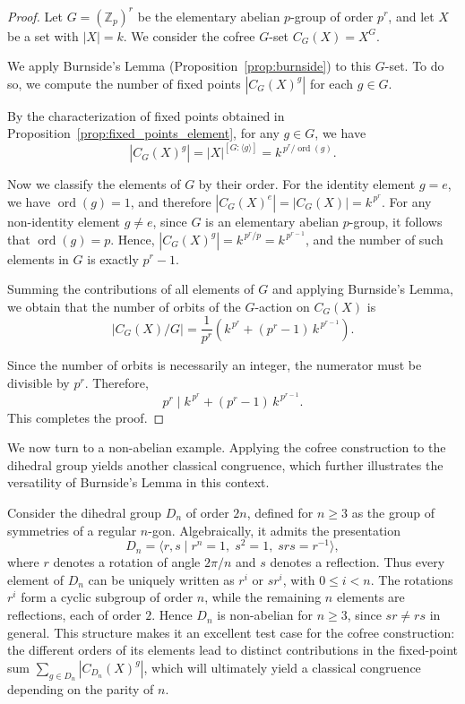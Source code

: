 \documentclass{amsart}
\begin{document}
\begin{proof}
Let $G = (\mathbb{Z}_p)^r$ be the elementary abelian $p$-group of order $p^r$, and let $X$ be a set with $|X| = k$. We consider the cofree $G$-set $C_G(X) = X^G$.

We apply Burnside's Lemma (Proposition~\ref{prop:burnside}) to this $G$-set. To do so, we compute the number of fixed points $|C_G(X)^g|$ for each $g \in G$.

By the characterization of fixed points obtained in Proposition~\ref{prop:fixed_points_element}, for any $g \in G$, we have
\[
\left\lvert C_G(X)^g \right\rvert = |X|^{[G : \langle g \rangle]} = k^{\, p^r / \operatorname{ord}(g)}.
\]

Now we classify the elements of $G$ by their order. For the identity element $g=e$, we have $\operatorname{ord}(g)=1$, and therefore $\left\lvert C_G(X)^e \right\rvert = |C_G(X)| = k^{\,p^r}$. For any non-identity element $g \neq e$, since $G$ is an elementary abelian $p$-group, it follows that $\operatorname{ord}(g)=p$. Hence, $\left\lvert C_G(X)^g \right\rvert = k^{\, p^r / p} = k^{\,p^{r-1}}$, and the number of such elements in $G$ is exactly $p^r - 1$.

Summing the contributions of all elements of $G$ and applying Burnside's Lemma, we obtain that the number of orbits of the $G$-action on $C_G(X)$ is
\[
\left\lvert C_G(X) / G \right\rvert
= \frac{1}{p^r}
\left( k^{\,p^r} + (p^r - 1)\, k^{\,p^{r-1}} \right).
\]

Since the number of orbits is necessarily an integer, the numerator must be divisible by $p^r$. Therefore,
\[
p^r \mid k^{\,p^r} + (p^r - 1)\, k^{\,p^{r-1}}.
\]
This completes the proof.
\end{proof}

We now turn to a non-abelian example. Applying the cofree construction to the dihedral group yields another classical congruence, which further illustrates the versatility of Burnside's Lemma in this context.

Consider the dihedral group $D_n$ of order $2n$, defined for $n \geq 3$ as the group of symmetries of a regular $n$-gon. Algebraically, it admits the presentation
\[
D_n = \langle r, s \mid r^n = 1,\; s^2 = 1,\; srs = r^{-1} \rangle,
\]
where $r$ denotes a rotation of angle $2\pi/n$ and $s$ denotes a reflection. Thus every element of $D_n$ can be uniquely written as $r^i$ or $sr^i$, with $0 \leq i < n$. The rotations $r^i$ form a cyclic subgroup of order $n$, while the remaining $n$ elements are reflections, each of order $2$. Hence $D_n$ is non-abelian for $n \geq 3$, since $sr \neq rs$ in general. This structure makes it an excellent test case for the cofree construction: the different orders of its elements lead to distinct contributions in the fixed-point sum $\sum_{g \in D_n} |C_{D_n}(X)^g|$, which will ultimately yield a classical congruence depending on the parity of $n$.
\end{document}

